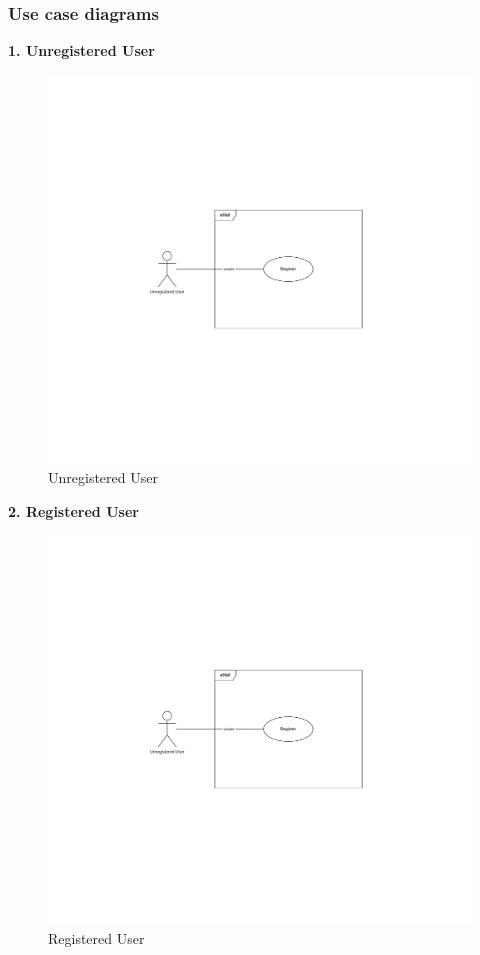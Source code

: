 \documentclass[11pt]{article}
\begin{document}
\newpage

\subsubsection{Use case diagrams}

\begin{description}
    \item \textbf{1. Unregistered User}
    \begin{figure}[!ht]
        \centering
        \includegraphics[page={1}, trim=7cm 9.7cm 7cm 9.6cm, width=0.6\linewidth, clip]{UseCases.pdf}
        \caption{Unregistered User}
    \end{figure}
    
    \item \textbf{2. Registered User}
    \begin{figure}[!ht]
        \centering
        \includegraphics[page={2}, trim=0cm 2.8cm 0cm 2.7cm, width=\linewidth, clip]{UseCases.pdf}
        \caption{Registered User}
    \end{figure}
    

\end{description}
\end{document}

